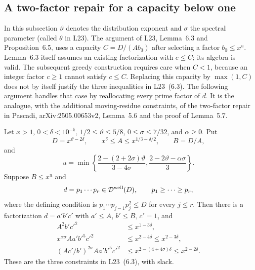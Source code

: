\subsection{A two-factor repair for a capacity below one}
\label{sec:two-factor-greedy-repair}

In this subsection $\vartheta$ denotes the distribution exponent and
$\sigma$ the spectral parameter (called $\theta$ in L23).
The argument of L23, Lemma~6.3 and Proposition~6.5, uses a capacity
$C=D/(A b_0)$ after selecting a factor $b_0\le x^u$.
Lemma~6.3 itself assumes an existing factorization with $c\le C$;
its algebra is valid.  The subsequent greedy construction requires
care when $C<1$, because an integer factor $c\ge1$ cannot satisfy
$c\le C$.  Replacing this capacity by $\max(1,C)$ does not by itself
justify the three inequalities in L23~(6.3).  The following argument
handles that case by reallocating every prime factor of $d$.
It is the analogue, with the additional moving-residue constraints,
of the two-factor repair in Pascadi, arXiv:2505.00653v2,
Lemma~5.6 and the proof of Lemma~5.7.

\begin{lemma}\label{lem:two-factor-greedy-repair}
Let $x>1$, $0<\delta<10^{-5}$, $1/2\le\vartheta\le5/8$,
$0\le\sigma\le7/32$, and $\alpha\ge0$.  Put
\[
 D=x^{\vartheta-2\delta},\qquad
 x^\delta\le A\le x^{1/3-\delta/2},\qquad B=D/A,
\]
and
\[
 u=\min\left\{
 \frac{2-(2+2\sigma)\vartheta}{3-4\sigma},
 \frac{2-2\vartheta-\alpha\sigma}{3}\right\}.
\]
Suppose $B\le x^u$ and
\[
 d=p_1\cdots p_r\in\mathcal D^{\rm well}(D),\qquad
 p_1\ge\cdots\ge p_r,
\]
where the defining condition is
$p_1\cdots p_{j-1}p_j^2\le D$ for every $j\le r$.
Then there is a factorization $d=a'b'c'$ with
$a'\le A$, $b'\le B$, $c'=1$, and
\begin{align}
 A^2b'c'^2&\le x^{1-3\delta},\label{eq:two-factor-repair-first}\\
 x^{\alpha\sigma}Aa'b'^5c'^2&\le x^{2-4\delta}
                       \le x^{2-3\delta},\label{eq:two-factor-repair-second}\\
 (Ac'/b')^{2\sigma}Aa'b'^5c'^2
   &\le x^{2-(4+4\sigma)\delta}
                       \le x^{2-2\delta}.
                       \label{eq:two-factor-repair-third}
\end{align}
These are the three constraints in L23~(6.3), with slack.
\end{lemma}

